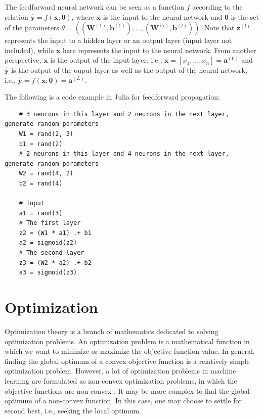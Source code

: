 \documentclass[
	parskip, 			   %
	twoside, 			   %
	DIV=14, 			   %
	BCOR=15.0mm, 		   %
	headsepline, 		   %
	open=right, 		   %
	captions=tableheading, %
	bibliography=totoc,    %
	numbers=noenddot       %
]{scrreprt}
\begin{document}
The feedforward neural network can be seen as a function $f$ according to the relation $\hat{\mathbf{y}} = f(\mathbf{x};\mathbf{\theta})$, where $\mathbf{x}$ is the input to the neural network and $\mathbf{\theta}$ is the set of the parameters $\theta=((\mathbf{W}^{(1)}, \mathbf{b}^{(1)}), ..., (\mathbf{W}^{(l)}, \mathbf{b}^{(l)}))$. Note that $\mathbf{z}^{(l)}$ represents the input to a hidden layer or an output layer (input layer not included), while $\mathbf{x}$ here represents the input to the neural network. From another perspective, $\mathbf{x}$ is the output of the input layer, i.e., $\mathbf{x}=[x_1, ..., x_n]=\mathbf{a}^{(0)}$ and $\hat{\mathbf{y}}$ is the output of the ouput layer as well as the output of the neural network, i.e., $\hat{\mathbf{y}}=f(\mathbf{x};\mathbf{\theta})=\mathbf{a}^{(L)}$. 

The following is a code example in Julia for feedforward propagation:

\begin{verbatim}
    # 3 neurons in this layer and 2 neurons in the next layer, generate random parameters
    W1 = rand(2, 3)
    b1 = rand(2)
    # 2 neurons in this layer and 4 neurons in the next layer, generate random parameters
    W2 = rand(4, 2)
    b2 = rand(4)
    
    # Input
    a1 = rand(3)
    # The first layer
    z2 = (W1 * a1) .+ b1
    a2 = sigmoid(z2)
    # The second layer
    z3 = (W2 * a2) .+ b2
    a3 = sigmoid(z3)
\end{verbatim}

\section{Optimization}
Optimization theory is a branch of mathematics dedicated to solving optimization problems. An optimization problem is a mathematical function in which we want to minimize or maximize the objective function value. In general, finding the global optimum of a convex objective function is a relatively simple optimization problem. However, a lot of optimization problems in machine learning are formulated as non-convex optimization problems, in which the objective functions are non-convex \cite{sun2019survey}. It may be more complex to find the global optimum of a non-convex function. In this case, one may choose to settle for second best, i.e., seeking the local optimum.
\end{document}
